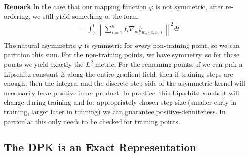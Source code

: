 \textbf{Remark} In the case that our mapping function $\varphi$ is not symmetric, after re-ordering, we still yield something of the form:
\begin{align}
&= \int_0^1 \left\lVert \sum_{i=1}^n f_i \nabla_{w}\hat{y}_{w_s(t,x_i)}\right\rVert^2 dt \\
\end{align}
The natural asymmetric $\varphi$ is symmetric for every non-training point, so we can partition this sum. For the non-training points, we have symmetry, so for those points we yield exactly the $L^2$ metric. For the remaining points, if we can pick a Lipschitz constant $E$ along the entire gradient field, then if training steps are enough, then the integral and the discrete step side of the asymmetric kernel will necessarily have positive inner product. In practice, this Lipschitz constant will change during training and for appropriately chosen step size (smaller early in training, larger later in training) we can guarantee positive-definiteness. In particular this only needs to be checked for training points. 

\subsection{The DPK is an Exact Representation}

